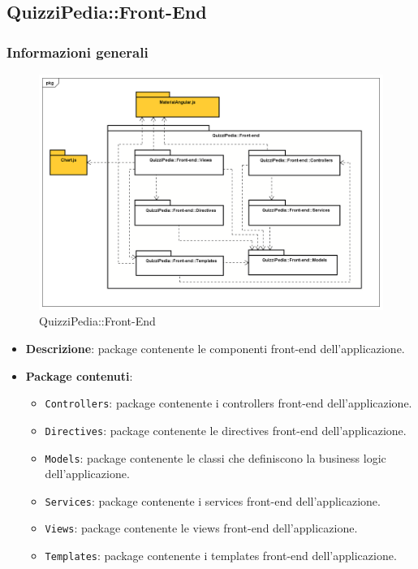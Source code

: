\subsection{QuizziPedia::Front-End}
\subsubsection{Informazioni generali}
\label{QuizziPedia::Front-End}
\begin{figure}[ht]
	\centering
	\includegraphics[scale=0.45]{UML/Package/QuizziPedia_Front-end.png}
	\caption{QuizziPedia::Front-End}
\end{figure}
\FloatBarrier
	\begin{itemize}
		\item \textbf{Descrizione}: package contenente le componenti front-end dell'applicazione.
		\item \textbf{Package contenuti}:
		\begin{itemize}
			\item \texttt{Controllers}: package contenente i controllers front-end dell'applicazione.
			\item \texttt{Directives}: package contenente le directives front-end dell'applicazione.
			\item \texttt{Models}: package contenente le classi che definiscono la business logic dell'applicazione.
			\item \texttt{Services}: package contenente i services front-end dell'applicazione.
			\item \texttt{Views}: package contenente le views front-end dell'applicazione.
			\item \texttt{Templates}: package contenente i templates front-end dell'applicazione.
		\end{itemize}
	\end{itemize}

